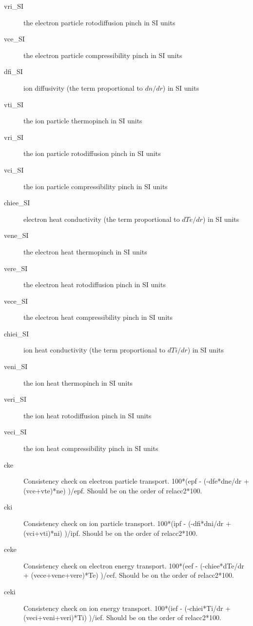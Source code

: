 \documentclass{article}
\begin{document}
\begin{description}
\item[vri\_SI] the electron particle rotodiffusion pinch in SI units

\item[vce\_SI] the electron particle compressibility pinch in SI units

\item[dfi\_SI] ion diffusivity (the term proportional to $dn/dr$) in SI units

\item[vti\_SI] the ion particle thermopinch in SI units

\item[vri\_SI] the ion particle rotodiffusion pinch in SI units

\item[vci\_SI] the ion particle compressibility pinch in SI units

\item[chiee\_SI] electron heat conductivity (the term proportional to $dTe/dr$) in SI units

\item[vene\_SI] the electron heat thermopinch in SI units

\item[vere\_SI] the electron heat rotodiffusion pinch in SI units

\item[vece\_SI] the electron heat compressibility pinch in SI units

\item[chiei\_SI] ion heat conductivity (the term proportional to $dTi/dr$) in SI units

\item[veni\_SI] the ion heat thermopinch in SI units

\item[veri\_SI] the ion heat rotodiffusion pinch in SI units

\item[veci\_SI] the ion heat compressibility pinch in SI units

\item[cke] Consistency check on electron particle transport. 100*(epf - (-dfe*dne/dr + (vce+vte)*ne) )/epf. Should be on the order of relacc2*100. 
\item[cki] Consistency check on ion particle transport. 100*(ipf - (-dfi*dni/dr + (vci+vti)*ni) )/ipf. Should be on the order of relacc2*100. 
\item[ceke] Consistency check on electron energy transport. 100*(eef - (-chiee*dTe/dr + (vece+vene+vere)*Te) )/eef. Should be on the order of relacc2*100. 
\item[ceki] Consistency check on ion energy transport. 100*(ief - (-chiei*Ti/dr + (veci+veni+veri)*Ti) )/ief. Should be on the order of relacc2*100. 


\end{description}
\end{document}
